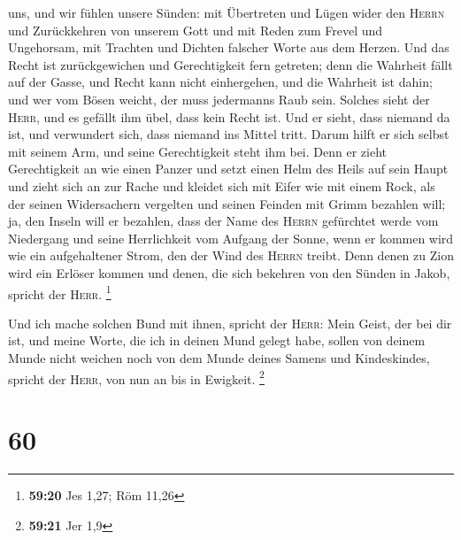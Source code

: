uns, und wir fühlen unsere Sünden:  mit Übertreten und
Lügen wider den \textsc{Herrn} und Zurückkehren von unserem Gott und mit
Reden zum Frevel und Ungehorsam, mit Trachten und Dichten falscher Worte
aus dem Herzen.  Und das Recht ist zurückgewichen und
Gerechtigkeit fern getreten; denn die Wahrheit fällt auf der Gasse, und
Recht kann nicht einhergehen,  und die Wahrheit ist
dahin; und wer vom Bösen weicht, der muss jedermanns Raub sein. Solches
sieht der \textsc{Herr}, und es gefällt ihm übel, dass kein Recht ist.
 Und er sieht, dass niemand da ist, und verwundert sich,
dass niemand ins Mittel tritt. Darum hilft er sich selbst mit seinem
Arm, und seine Gerechtigkeit steht ihm bei.  Denn er
zieht Gerechtigkeit an wie einen Panzer und setzt einen Helm des Heils
auf sein Haupt und zieht sich an zur Rache und kleidet sich mit Eifer
wie mit einem Rock,  als der seinen Widersachern
vergelten und seinen Feinden mit Grimm bezahlen will; ja, den Inseln
will er bezahlen,  dass der Name des \textsc{Herrn}
gefürchtet werde vom Niedergang und seine Herrlichkeit vom Aufgang der
Sonne, wenn er kommen wird wie ein aufgehaltener Strom, den der Wind des
\textsc{Herrn} treibt.  Denn denen zu Zion wird ein
Erlöser kommen und denen, die sich bekehren von den Sünden in Jakob,
spricht der \textsc{Herr}. \footnote{\textbf{59:20} Jes 1,27; Röm 11,26}

 Und ich mache solchen Bund mit ihnen, spricht der
\textsc{Herr}: Mein Geist, der bei dir ist, und meine Worte, die ich in
deinen Mund gelegt habe, sollen von deinem Munde nicht weichen noch von
dem Munde deines Samens und Kindeskindes, spricht der \textsc{Herr}, von
nun an bis in Ewigkeit. \footnote{\textbf{59:21} Jer 1,9}

\hypertarget{section-23}{%
\section{60}\label{section-23}}

